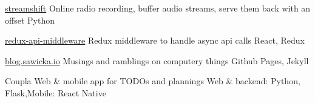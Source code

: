 
\begin{cvprojects}

	\cvproject
		{\faGithub\acvHeaderIconSep \href{https://github.com/goshasawicka/streamshift}{streamshift}}
		{Online radio recording, buffer audio streams, serve them back with an offset}
		{Python}

	\cvproject
		{\faGithub\acvHeaderIconSep \href{https://github.com/goshasawicka/redux-api-middleware}{redux-api-middleware}}
		{Redux middleware to handle async api calls}
		{React, Redux}

	\cvproject
		{\faGithub\acvHeaderIconSep \href{http://blog.sawicka.io}{blog.sawicka.io}}
		{Musings and ramblings on computery things}
		{Github Pages, Jekyll}

	\cvproject
		{Coupla}
		{Web \& mobile app for TODOs and plannings}
		{Web \& backend: Python, Flask,\newline Mobile: React Native}

\end{cvprojects}
